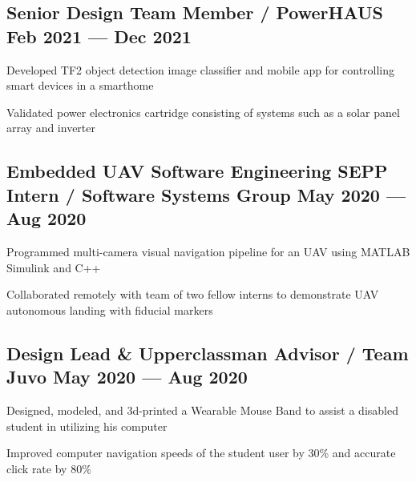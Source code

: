 \subsection{{Senior Design Team Member / PowerHAUS \hfill Feb 2021 --- Dec 2021}}
\begin{zitemize}
	\item Developed TF2 object detection image classifier and mobile app for controlling smart devices in a smarthome
	\item Validated power electronics cartridge consisting of systems such as a solar panel array and inverter
\end{zitemize}


\subsection{{Embedded UAV Software Engineering SEPP Intern / Software Systems Group  \hfill May 2020 --- Aug 2020}}
\begin{zitemize}
	\item Programmed multi-camera visual navigation pipeline for an UAV using MATLAB Simulink and C++
	\item Collaborated remotely with team of two fellow interns to demonstrate UAV autonomous landing with fiducial
	markers
\end{zitemize}

\subsection{{Design Lead & Upperclassman Advisor / Team Juvo  \hfill May 2020 --- Aug 2020}}
\begin{zitemize}
	\item Designed, modeled, and 3d-printed a Wearable Mouse Band to assist a disabled student in utilizing his computer
	\item Improved computer navigation speeds of the student user by 30\% and accurate click rate by 80\%
\end{zitemize}


